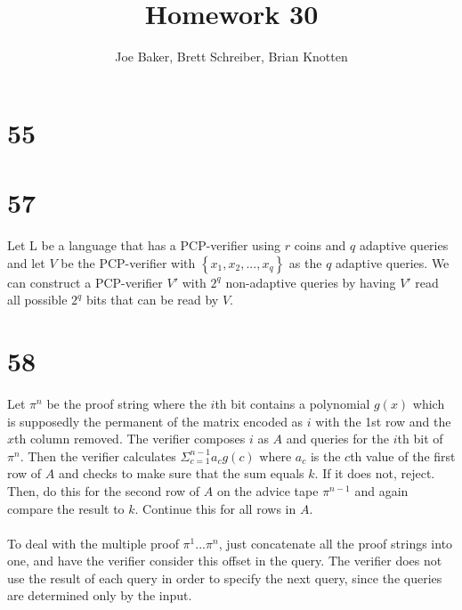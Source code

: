 \documentclass[letterpaper,notitlepage,twoside]{article}
\begin{document}
\title{Homework 30}
\author{Joe Baker, Brett Schreiber, Brian Knotten}
\maketitle

\section*{55}
\section*{57}
Let L be a language that has a PCP-verifier using $r$ coins and $q$ adaptive queries and let $V$ be the PCP-verifier with $\left\{x_1,x_2,...,x_q\right\}$ as the $q$ adaptive queries. We can construct a PCP-verifier $V'$ with $2^q$ non-adaptive queries by having $V'$ read all possible $2^q$ bits that can be read by $V$.

\section*{58}
Let $\pi^n$ be the proof string where the $i$th bit contains a polynomial $g(x)$ which is supposedly the permanent of the matrix encoded as $i$ with the 1st row and the $x$th column removed. The verifier composes $i$ as $A$ and queries for the $i$th bit of $\pi^n$. Then the verifier calculates $\Sigma_{c = 1}^{n - 1}a_cg(c)$ where $a_c$ is the $c$th value of the first row of $A$ and checks to make sure that the sum equals $k$. If it does not, reject. Then, do this for the second row of $A$ on the advice tape $\pi^{n - 1}$ and again compare the result to $k$. Continue this for all rows in $A$. \\\\
To deal with the multiple proof $\pi^1...\pi^n$, just concatenate all the proof strings into one, and have the verifier consider this offset in the query. The verifier does not use the result of each query in order to specify the next query, since the queries are determined only by the input.
\end{document}
